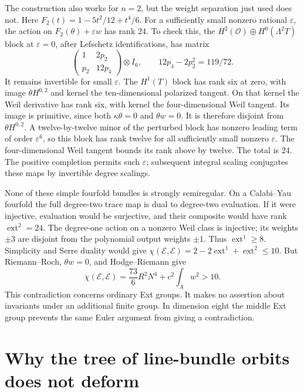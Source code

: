 \documentclass[11pt]{article}
\theoremstyle{definition}
\theoremstyle{remark}
\begin{document}
The construction also works for $n=2$, but the weight separation
just used does not.  Here
$F_2(t)=1-5t^2/12+t^4/6$.
For a sufficiently small nonzero rational $\varepsilon$, the action
on $F_2(\theta)+\varepsilon w$ has rank $24$.
To check this, the $H^2(\mathcal O)\oplus H^0(\Lambda^2T)$ block
at $\varepsilon=0$, after Lefschetz identifications, has matrix
\[
 \begin{pmatrix}1&2p_2\\p_2&12p_4\end{pmatrix}\otimes I_6,
 \qquad 12p_4-2p_2^2=119/72.
\]
It remains invertible for small $\varepsilon$.
The $H^1(T)$ block has rank six at zero, with image
$\theta H^{0,2}$ and kernel the ten-dimensional polarized tangent.
On that kernel the Weil derivative has rank six, with kernel the
four-dimensional Weil tangent.  Its image is primitive, since
both $\kappa\theta=0$ and $\theta w=0$.
It is therefore disjoint from $\theta H^{0,2}$.
A twelve-by-twelve minor of the perturbed block has nonzero leading
term of order $\varepsilon^6$, so this block has rank twelve for
all sufficiently small nonzero $\varepsilon$.  The four-dimensional
Weil tangent bounds its rank above by twelve.  The total is $24$.
The positive completion permits such $\varepsilon$; subsequent
integral scaling conjugates these maps by invertible degree scalings.

None of these simple fourfold bundles is strongly semiregular.
On a Calabi--Yau fourfold the full degree-two trace map is dual to
degree-two evaluation.  If it were injective, evaluation would be
surjective, and their composite would have rank
$\operatorname{ext}^2=24$.
The degree-one action on a nonzero Weil class is injective; its
weights $\pm3$ are disjoint from the polynomial output weights
$\pm1$.  Thus $\operatorname{ext}^1\ge8$.
Simplicity and Serre duality would give
$\chi(\mathcal E,\mathcal E)=2-2\operatorname{ext}^1+
\operatorname{ext}^2\le10$.
But Riemann--Roch, $\theta w=0$, and Hodge--Riemann give
\[
 \chi(\mathcal E,\mathcal E)
 =\frac{73}{6}R^2N^4+c^2\int_Aw^2>10.
\]
This contradiction concerns ordinary Ext groups.  It makes no
assertion about invariants under an additional finite group.
In dimension eight the middle Ext group prevents the same Euler
argument from giving a contradiction.
\section{Why the tree of line-bundle orbits does not deform}
\label{sec:tree-extension-obstruction}
\end{document}
